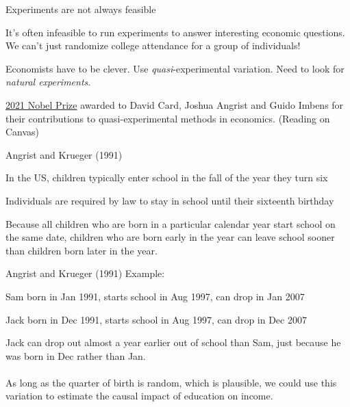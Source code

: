 \documentclass{./../div_teaching_slides}
\begin{document}
\begin{frame}{Experiments are not always feasible}
\begin{witemize}
  \item It's often infeasible to run experiments to answer interesting economic questions. We can't just randomize college attendance for a group of individuals!
  \item Economists have to be clever. Use \textit{quasi}-experimental variation. Need to look for \textit{natural experiments}.
  \item \href{https://www.nobelprize.org/prizes/economic-sciences/2021/press-release/}{2021 Nobel Prize} awarded to David Card, Joshua Angrist and Guido Imbens for their contributions to quasi-experimental methods in economics. (Reading on Canvas)
\end{witemize}
\end{frame}

\begin{frame}{Angrist and Krueger (1991)}
\begin{witemize}
  \item In the US, children typically enter school in the fall of the year they turn six 
  \item Individuals are required by law to stay in school until their sixteenth birthday
  \item Because all children who are born in a particular calendar year start school on the same date, children who are born early in the year can leave school sooner than children born later in the year.
\end{witemize}
\end{frame}

\begin{frame}{Angrist and Krueger (1991)}
Example: \\
\begin{witemize}
  \item Sam born in Jan 1991, starts school in Aug 1997, can drop in Jan 2007
  \item Jack born in Dec 1991, starts school in Aug 1997, can drop in Dec 2007 
\end{witemize}
Jack can drop out almost a year earlier out of school than Sam, just because he was born in Dec rather than Jan. \\~\\
As long as the quarter of birth is random, which is plausible, we could use this variation to estimate the causal impact of education on income. 
\end{frame}
\end{document}
